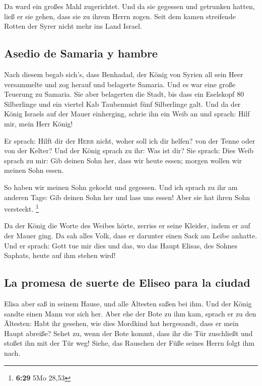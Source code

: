  Da ward ein großes Mahl zugerichtet. Und da sie gegessen
und getrunken hatten, ließ er sie gehen, dass sie zu ihrem Herrn zogen.
Seit dem kamen streifende Rotten der Syrer nicht mehr ins Land Israel.

\hypertarget{asedio-de-samaria-y-hambre}{%
\subsection{Asedio de Samaria y
hambre}\label{asedio-de-samaria-y-hambre}}

 Nach diesem begab sich's, dass Benhadad, der König von
Syrien all sein Heer versammelte und zog herauf und belagerte Samaria.
 Und es war eine große Teuerung zu Samaria. Sie aber
belagerten die Stadt, bis dass ein Eselskopf 80 Silberlinge und ein
viertel Kab Taubenmist fünf Silberlinge galt.  Und da der
König Israels auf der Mauer einherging, schrie ihn ein Weib an und
sprach: Hilf mir, mein Herr König!

 Er sprach: Hilft dir der \textsc{Herr} nicht, woher soll
ich dir helfen? von der Tenne oder von der Kelter?  Und
der König sprach zu ihr: Was ist dir? Sie sprach: Dies Weib sprach zu
mir: Gib deinen Sohn her, dass wir heute essen; morgen wollen wir meinen
Sohn essen.

 So haben wir meinen Sohn gekocht und gegessen. Und ich
sprach zu ihr am anderen Tage: Gib deinen Sohn her und lass uns essen!
Aber sie hat ihren Sohn versteckt. \footnote{\textbf{6:29} 5Mo 28,53}

 Da der König die Worte des Weibes hörte, zerriss er
seine Kleider, indem er auf der Mauer ging. Da sah alles Volk, dass er
darunter einen Sack am Leibe anhatte.  Und er sprach:
Gott tue mir dies und das, wo das Haupt Elisas, des Sohnes Saphats,
heute auf ihm stehen wird!

\hypertarget{la-promesa-de-suerte-de-eliseo-para-la-ciudad}{%
\subsection{La promesa de suerte de Eliseo para la
ciudad}\label{la-promesa-de-suerte-de-eliseo-para-la-ciudad}}

 Elisa aber saß in seinem Hause, und alle Ältesten saßen
bei ihm. Und der König sandte einen Mann vor sich her. Aber ehe der Bote
zu ihm kam, sprach er zu den Ältesten: Habt ihr gesehen, wie dies
Mordkind hat hergesandt, dass er mein Haupt abreiße? Sehet zu, wenn der
Bote kommt, dass ihr die Tür zuschließt und stoßet ihn mit der Tür weg!
Siehe, das Rauschen der Füße seines Herrn folgt ihm nach.

